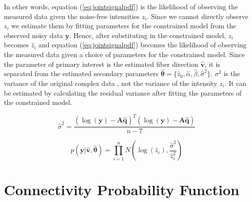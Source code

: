 In other words, equation (\ref{eq:jointsignalpdf}) is the likelihood of observing the measured data given the noise-free intensities $z_i$.  Since we cannot directly observe $z_i$ we estimate them by fitting parameters for the constrained model from the observed noisy data $\mathbf{y}$.  Hence, after substituting in the constrained model, $z_i$ becomes $\hat{z}_i$ and equation (\ref{eq:jointsignalpdf}) becomes the likelihood of observing the measured data given a choice of parameters for the constrained model.  Since the parameter of primary interest is the estimated fiber direction $\mathbf{\hat{v}}$, it is separated from the estimated secondary parameters $\mathbf{\hat{\theta}} = \{\hat{z}_0, \hat{\alpha}, \hat{\beta}, \hat{\sigma}^2\}$.  $\sigma^2$ is the variance of the original complex data \cite{salvador}, not the variance of the intensity $z_i$.  It can be estimated by calculating the residual variance after fitting the parameters of the constrained model.

\begin{equation} \label{eq:ResVar}
\hat{\sigma}^2 = \frac{(\log(\mathbf{y})-\mathbf{A}\hat{\mathbf{q}})^T(\log(\mathbf{y})-\mathbf{A}\hat{\mathbf{q}})}{n - 7}
\end{equation}

\begin{equation} \label{eq:likelihood}
p(\mathbf{y}|\mathbf{\hat{v}},\mathbf{\hat{\theta}}) = \prod_{i=1}^{n}N\left( \log(\hat{z}_i), \frac{\hat{\sigma}^2}{\hat{z}_i^2} \right)
\end{equation}



\section{Connectivity Probability Function}
 
